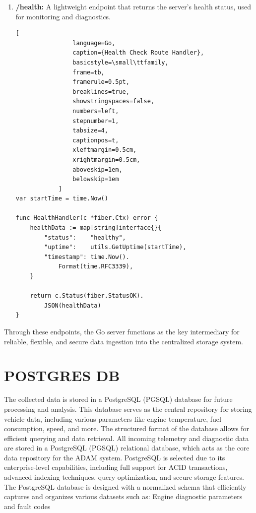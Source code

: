 \begin{enumerate}
\begin{lstlisting}
    if err := rows.Err(); err != nil {
        log.Printf("Row iteration error: %v", err)
        return c.Status(500).JSON(
            fiber.Map{"error": "Read error"})
    }

    return c.JSON(fiber.Map{
        "data":    result,
        "count":   len(result),
        "columns": columns,
    })
}
            \end{lstlisting}
        \item \textbf{/health:} 
            A lightweight endpoint that returns the server's health status, used for monitoring and diagnostics.
            \begin{lstlisting}[
                language=Go, 
                caption={Health Check Route Handler},
                basicstyle=\small\ttfamily,
                frame=tb,
                framerule=0.5pt,
                breaklines=true,
                showstringspaces=false,
                numbers=left,
                stepnumber=1,
                tabsize=4,
                captionpos=t,
                xleftmargin=0.5cm,
                xrightmargin=0.5cm,
                aboveskip=1em,
                belowskip=1em
            ]
var startTime = time.Now()

func HealthHandler(c *fiber.Ctx) error {
    healthData := map[string]interface{}{
        "status":    "healthy",
        "uptime":    utils.GetUptime(startTime),
        "timestamp": time.Now().
            Format(time.RFC3339),
    }

    return c.Status(fiber.StatusOK).
        JSON(healthData)
}

            \end{lstlisting}
    \end{enumerate}
    Through these endpoints, the Go server functions as the key intermediary for reliable, flexible, and secure data ingestion into the centralized storage system.
\section{POSTGRES DB}
    The collected data is stored in a PostgreSQL (PGSQL) database for future processing and analysis. This database serves as the central repository for storing vehicle data, including various parameters like engine temperature, fuel consumption, speed, and more. The structured format of the database allows for efficient querying and data retrieval.
    All incoming telemetry and diagnostic data are stored in a PostgreSQL (PGSQL) relational database, which acts as the core data repository for the ADAM system. PostgreSQL is selected due to its enterprise-level capabilities, including full support for ACID transactions, advanced indexing techniques, query optimization, and secure storage features.
    The PostgreSQL database is designed with a normalized schema that efficiently captures and organizes various datasets such as:
    Engine diagnostic parameters and fault codes

